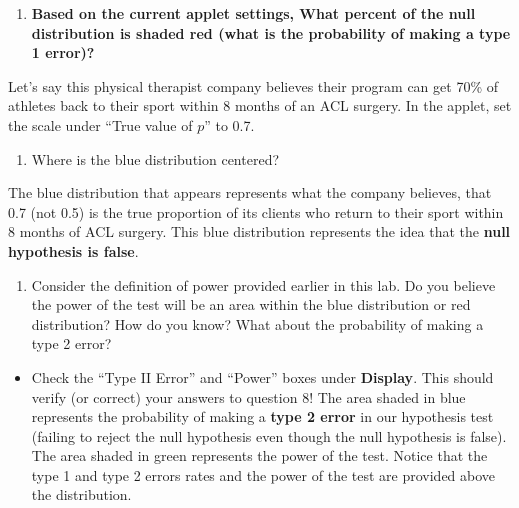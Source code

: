 \documentclass[
]{report}
\providecommand{\tightlist}{%
  \setlength{\itemsep}{0pt}\setlength{\parskip}{0pt}}
\begin{document}
\begin{enumerate}
\def\labelenumi{\arabic{enumi}.}
\setcounter{enumi}{5}
\tightlist
\item
  \textbf{Based on the current applet settings, What percent of the null distribution is shaded red (what is the probability of making a type 1 error)?}
  \vspace{0.25in}
\end{enumerate}

Let's say this physical therapist company believes their program can get 70\% of athletes back to their sport within 8 months of an ACL surgery. In the applet, set the scale under ``True value of \(p\)'' to 0.7.

\begin{enumerate}
\def\labelenumi{\arabic{enumi}.}
\setcounter{enumi}{6}
\tightlist
\item
  Where is the blue distribution centered?
  \vspace{0.25in}
\end{enumerate}

The blue distribution that appears represents what the company believes, that 0.7 (not 0.5) is the true proportion of its clients who return to their sport within 8 months of ACL surgery. This blue distribution represents the idea that the \textbf{null hypothesis is false}.

\begin{enumerate}
\def\labelenumi{\arabic{enumi}.}
\setcounter{enumi}{7}
\tightlist
\item
  Consider the definition of power provided earlier in this lab. Do you believe the power of the test will be an area within the blue distribution or red distribution? How do you know? What about the probability of making a type 2 error?
  \vspace{1in}
\end{enumerate}

\begin{itemize}
\tightlist
\item
  Check the ``Type II Error'' and ``Power'' boxes under \textbf{Display}. This should verify (or correct) your answers to question 8! The area shaded in blue represents the probability of making a \textbf{type 2 error} in our hypothesis test (failing to reject the null hypothesis even though the null hypothesis is false). The area shaded in green represents the power of the test. Notice that the type 1 and type 2 errors rates and the power of the test are provided above the distribution.
\end{itemize}
\end{document}
